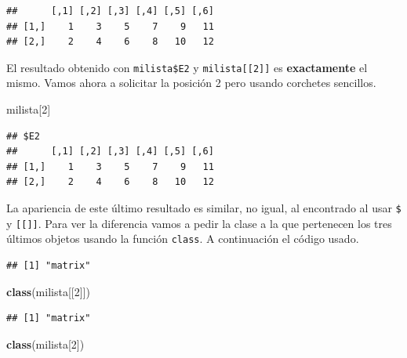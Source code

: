 \documentclass[10pt,]{krantz}
\makeatletter
\newenvironment{Shaded}{\begin{snugshade}}{\end{snugshade}}
\newcommand{\KeywordTok}[1]{\textcolor[rgb]{0.13,0.29,0.53}{\textbf{#1}}}
\newcommand{\DecValTok}[1]{\textcolor[rgb]{0.00,0.00,0.81}{#1}}
\newcommand{\OperatorTok}[1]{\textcolor[rgb]{0.81,0.36,0.00}{\textbf{#1}}}
\newcommand{\NormalTok}[1]{#1}
\newenvironment{kframe}{%
\medskip{}
\setlength{\fboxsep}{.8em}
 \def\at@end@of@kframe{}%
 \ifinner\ifhmode%
  \def\at@end@of@kframe{\end{minipage}}%
  \begin{minipage}{\columnwidth}%
 \fi\fi%
 \def\FrameCommand##1{\hskip\@totalleftmargin \hskip-\fboxsep
 \colorbox{shadecolor}{##1}\hskip-\fboxsep
     \hskip-\linewidth \hskip-\@totalleftmargin \hskip\columnwidth}%
 \MakeFramed {\advance\hsize-\width
   \@totalleftmargin\z@ \linewidth\hsize
   \@setminipage}}%
 {\par\unskip\endMakeFramed%
 \at@end@of@kframe}
\renewenvironment{Shaded}{\begin{kframe}}{\end{kframe}}
\makeatother
\begin{document}
\begin{verbatim}
##      [,1] [,2] [,3] [,4] [,5] [,6]
## [1,]    1    3    5    7    9   11
## [2,]    2    4    6    8   10   12
\end{verbatim}

El resultado obtenido con \texttt{milista\$E2} y
\texttt{milista{[}{[}2{]}{]}} es \textbf{exactamente} el mismo. Vamos
ahora a solicitar la posición 2 pero usando corchetes sencillos.

\begin{Shaded}
\begin{Highlighting}[]
\NormalTok{milista[}\DecValTok{2}\NormalTok{]}
\end{Highlighting}
\end{Shaded}

\begin{verbatim}
## $E2
##      [,1] [,2] [,3] [,4] [,5] [,6]
## [1,]    1    3    5    7    9   11
## [2,]    2    4    6    8   10   12
\end{verbatim}

La apariencia de este último resultado es similar, no igual, al
encontrado al usar \texttt{\$} y \texttt{{[}{[}{]}{]}}. Para ver la
diferencia vamos a pedir la clase a la que pertenecen los tres últimos
objetos usando la función \texttt{class}. A continuación el código
usado.

\begin{Shaded}
\end{Shaded}

\begin{verbatim}
## [1] "matrix"
\end{verbatim}

\begin{Shaded}
\begin{Highlighting}[]
\KeywordTok{class}\NormalTok{(milista[[}\DecValTok{2}\NormalTok{]])}
\end{Highlighting}
\end{Shaded}

\begin{verbatim}
## [1] "matrix"
\end{verbatim}

\begin{Shaded}
\begin{Highlighting}[]
\KeywordTok{class}\NormalTok{(milista[}\DecValTok{2}\NormalTok{])}
\end{Highlighting}
\end{Shaded}
\end{document}
